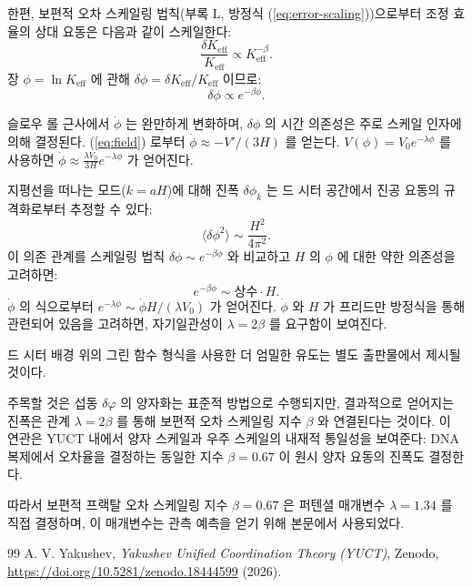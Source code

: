 \documentclass[11pt,a4paper]{article}
\theoremstyle{remark}
\newcommand{\Keff}{K_{\mathrm{eff}}}
\begin{document}
	한편, 보편적 오차 스케일링 법칙(부록 L, 방정식 (\ref{eq:error-scaling}))으로부터 조정 효율의 상대 요동은 다음과 같이 스케일한다:
	\begin{equation}
		\frac{\delta\Keff}{\Keff} \propto \Keff^{-\beta}.
	\end{equation}
	장 $\phi = \ln\Keff$ 에 관해 $\delta\phi = \delta\Keff/\Keff$ 이므로:
	\begin{equation}
		\delta\phi \propto e^{-\beta\phi}.
	\end{equation}
	
	슬로우 롤 근사에서 $\dot{\phi}$ 는 완만하게 변화하며, $\delta\phi$ 의 시간 의존성은 주로 스케일 인자에 의해 결정된다. (\ref{eq:field}) 로부터 $\dot{\phi} \approx -V'/(3H)$ 를 얻는다. $V(\phi) = V_0 e^{-\lambda\phi}$ 를 사용하면 $\dot{\phi} \approx \frac{\lambda V_0}{3H} e^{-\lambda\phi}$ 가 얻어진다.
	
	지평선을 떠나는 모드($k = aH$)에 대해 진폭 $\delta\phi_k$ 는 드 시터 공간에서 진공 요동의 규격화로부터 추정할 수 있다:
	\begin{equation}
		\langle \delta\phi^2 \rangle \sim \frac{H^2}{4\pi^2}.
	\end{equation}
	이 의존 관계를 스케일링 법칙 $\delta\phi \sim e^{-\beta\phi}$ 와 비교하고 $H$ 의 $\phi$ 에 대한 약한 의존성을 고려하면:
	\begin{equation}
		e^{-\beta\phi} \sim \text{상수} \cdot H.
	\end{equation}
	$\dot{\phi}$ 의 식으로부터 $e^{-\lambda\phi} \sim \dot{\phi} H / (\lambda V_0)$ 가 얻어진다. $\dot{\phi}$ 와 $H$ 가 프리드만 방정식을 통해 관련되어 있음을 고려하면, 자기일관성이 $\lambda = 2\beta$ 를 요구함이 보여진다.
	
	드 시터 배경 위의 그린 함수 형식을 사용한 더 엄밀한 유도는 별도 출판물에서 제시될 것이다.
	
	주목할 것은 섭동 $\delta\varphi$ 의 양자화는 표준적 방법으로 수행되지만, 결과적으로 얻어지는 진폭은 관계 $\lambda = 2\beta$ 를 통해 보편적 오차 스케일링 지수 $\beta$ 와 연결된다는 것이다. 이 연관은 YUCT 내에서 양자 스케일과 우주 스케일의 내재적 통일성을 보여준다: DNA 복제에서 오차율을 결정하는 동일한 지수 $\beta = 0.67$ 이 원시 양자 요동의 진폭도 결정한다.
	
	따라서 보편적 프랙탈 오차 스케일링 지수 $\beta = 0.67$ 은 퍼텐셜 매개변수 $\lambda = 1.34$ 를 직접 결정하며, 이 매개변수는 관측 예측을 얻기 위해 본문에서 사용되었다.
	
	\begin{thebibliography}{99}
		A. V. Yakushev, \emph{Yakushev Unified Coordination Theory (YUCT)}, Zenodo, \url{https://doi.org/10.5281/zenodo.18444599} (2026).
	\end{thebibliography}
	
\end{document}
